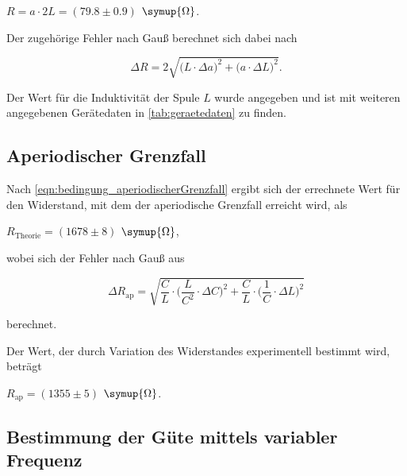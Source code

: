 \begin{center}
    $R = a \cdot 2L = (79.8 \pm 0.9)$ $\symup{\Omega}$.
\end{center}

Der zugehörige Fehler nach Gauß berechnet sich dabei nach

\begin{equation}
    \Delta R = 2 \sqrt{ \bigg( L \cdot \Delta a \bigg)^2 + \bigg( a \cdot \Delta L \bigg)^2 }.
\end{equation}

Der Wert für die Induktivität der Spule $L$ wurde angegeben und ist mit weiteren angegebenen Gerätedaten in \autoref{tab:geraetedaten} zu finden.



\subsection{Aperiodischer Grenzfall}

Nach \eqref{eqn:bedingung_aperiodischerGrenzfall} ergibt sich der errechnete Wert für den Widerstand, mit dem der aperiodische Grenzfall erreicht wird, als

\begin{center}
    $R_\text{Theorie} = (1678 \pm 8)$ $\symup{\Omega}$,
\end{center}

wobei sich der Fehler nach Gauß aus %

\begin{equation}
    \Delta R_\text{ap} = \sqrt{ \frac{C}{L} \cdot \bigg( \frac{L}{C^2} \cdot \Delta C \bigg)^2 + \frac{C}{L} \cdot \bigg( \frac{1}{C} \cdot \Delta L \bigg)^2 }
\end{equation}

berechnet.

Der Wert, der durch Variation des Widerstandes experimentell bestimmt wird, beträgt

\begin{center}
    $R_\text{ap} = (1355 \pm 5)$ $\symup{\Omega}$.
\end{center}


\subsection{Bestimmung der Güte mittels variabler Frequenz}

